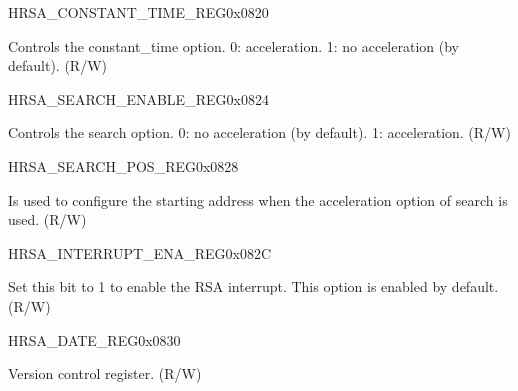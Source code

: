 \begin{register}{H}{RSA\_CONSTANT\_TIME\_REG}{0x0820}\label{regdesc:RSACONSTANTTIMEREG}
%
%
\regnewline%
\begin{regdesc}\begin{reglist}
\item [RSA\_CONSTANT\_TIME\_REG] Controls the constant\_time option. 0: acceleration. 1: no acceleration (by default). (R/W)
\end{reglist}\end{regdesc}
\end{register}


\begin{register}{H}{RSA\_SEARCH\_ENABLE\_REG}{0x0824}\label{regdesc:RSASEARCHENABLEREG}
%
%
\regnewline%
\begin{regdesc}\begin{reglist}
\item [RSA\_SEARCH\_ENABLE] Controls the search option. 0: no acceleration (by default). 1: acceleration. (R/W)
\end{reglist}\end{regdesc}
\end{register}



\begin{register}{H}{RSA\_SEARCH\_POS\_REG}{0x0828}\label{regdesc:RSASEARCHPOSREG}
%
%
\regnewline%
\begin{regdesc}\begin{reglist}
\item [RSA\_SEARCH\_POS] Is used to configure the starting address when the acceleration option of search is used. (R/W)
\end{reglist}\end{regdesc}
\end{register}


\begin{register}{H}{RSA\_INTERRUPT\_ENA\_REG}{0x082C}\label{regdesc:RSAINTERRUPTENAREG}
%
%
\regnewline%
\begin{regdesc}\begin{reglist}
\item [RSA\_INTERRUPT\_ENA] Set this bit to 1 to enable the RSA interrupt. This option is enabled by default. (R/W)
\end{reglist}\end{regdesc}
\end{register}


\begin{register}{H}{RSA\_DATE\_REG}{0x0830}\label{regdesc:RSADATEREG}
%
%
\regnewline%
\begin{regdesc}\begin{reglist}
\item [RSA\_DATE] Version control register. (R/W)
\end{reglist}\end{regdesc}
\end{register}
